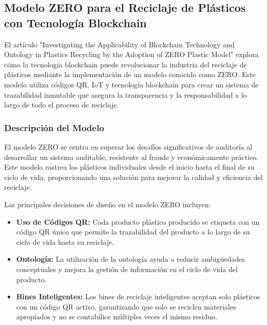 \documentclass[main.tex]{subfiles}
\begin{document}
\subsection{Modelo ZERO para el Reciclaje de Plásticos con Tecnología Blockchain}
El artículo "Investigating the Applicability of Blockchain Technology and Ontology in Plastics Recycling by the Adoption of ZERO Plastic Model" \cite{sandhiya2020investigating} explora cómo la tecnología blockchain puede revolucionar la industria del reciclaje de plásticos mediante la implementación de un modelo conocido como ZERO. Este modelo utiliza códigos QR, IoT y tecnología blockchain para crear un sistema de trazabilidad inmutable que asegura la transparencia y la responsabilidad a lo largo de todo el proceso de reciclaje.

\subsubsection{Descripción del Modelo}
El modelo ZERO se centra en superar los desafíos significativos de auditoría al desarrollar un sistema auditable, resistente al fraude y económicamente práctico. Este modelo rastrea los plásticos individuales desde el inicio hasta el final de su ciclo de vida, proporcionando una solución para mejorar la calidad y eficiencia del reciclaje.

Las principales decisiones de diseño en el modelo ZERO incluyen:
\begin{itemize}
    \item \textbf{Uso de Códigos QR:} Cada producto plástico producido se etiqueta con un código QR único que permite la trazabilidad del producto a lo largo de su ciclo de vida hasta su reciclaje.
    \item \textbf{Ontología:} La utilización de la ontología ayuda a reducir ambigüedades conceptuales y mejora la gestión de información en el ciclo de vida del producto.
    \item \textbf{Bines Inteligentes:} Los bines de reciclaje inteligentes aceptan solo plásticos con un código QR activo, garantizando que solo se reciclen materiales apropiados y no se contabilice múltiples veces el mismo residuo.
\end{itemize}
\end{document}
